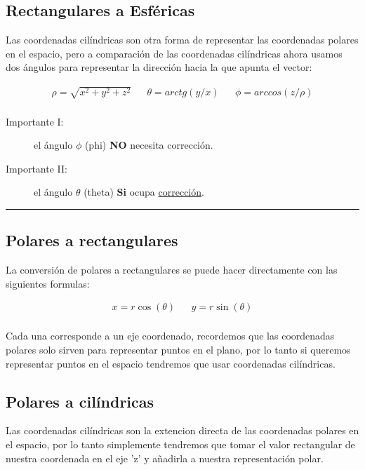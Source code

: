 \documentclass{article}
\begin{document}
\subsection{Rectangulares a Esféricas}
\label{sec:org2ddbefb}
Las coordenadas cilíndricas son otra forma de representar las coordenadas polares en el espacio, pero a comparación de las coordenadas cilíndricas ahora usamos dos ángulos para representar la dirección hacia la que apunta el vector: 

\[\begin{aligned}
 \rho = \sqrt{x^2+y^2+z^2} && 
 \theta = arctg\left( y/x \right)  &&
 \phi = arccos\left( z/\rho \right) \\
\end{aligned}\] 

\begin{description}
\item[{Importante I:}] el ángulo \(\phi\) (phi) \textbf{NO} necesita corrección.
\item[{Importante II:}] el ángulo \(\theta\) (theta) \textbf{Si} ocupa \hyperref[tab:org0dd5f7f]{corrección}.
\end{description}

\noindent\rule{\textwidth}{0.5pt}

\subsection{Polares a rectangulares}
\label{sec:orgef13a93}
La conversión de polares a rectangulares se puede hacer directamente con las siguientes formulas: 

\[\begin{aligned}
 x = r \cos(\theta) && y = r \sin(\theta) \\
\end{aligned}\] 

Cada una corresponde a un eje coordenado, recordemos que las coordenadas polares solo sirven para representar puntos en el plano, por lo tanto si queremos representar puntos en el espacio tendremos que usar coordenadas cilíndricas.

\subsection{Polares a cilíndricas}
\label{sec:org6cf2e96}
Las coordenadas cilíndricas son la extencion directa de las coordenadas polares en el espacio, por lo tanto simplemente tendremos que tomar el valor rectangular de nuestra coordenada en el eje 'z' y añadirla a nuestra representación polar.
\end{document}
